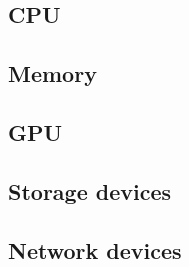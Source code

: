 \subsection{CPU}

\subsection{Memory}

\subsection{GPU}

\subsection{Storage devices}

\subsection{Network devices}